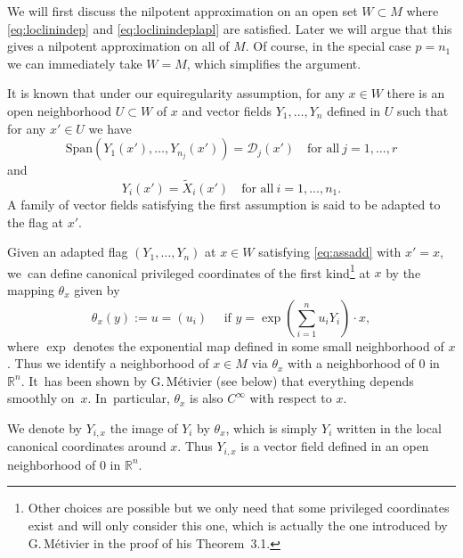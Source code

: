 \documentclass[10pt]{amsart}
\theoremstyle{definition}
\newcommand{\1}{\mathbbm{1}}
\newcommand{\R}{\mathbb{R}}
\begin{document}
We will first discuss the nilpotent approximation on an open set $W\subset M$ where \eqref{eq:loclinindep} and \eqref{eq:loclinindeplapl} are satisfied. Later we will argue that this gives a nilpotent approximation on all of $M$. Of course, in the special case $p=n_1$ we can immediately take $W=M$, which simplifies the argument.

It is known that under our equiregularity assumption, for any $x\in W$ there is an open neighborhood $U\subset W$ of $x$ and vector fields $Y_1,\ldots,Y_n$ defined in $U$ such that for any $x'\in U$ we have
\[
\text{Span}(Y_1(x'),\ldots,Y_{n_j}(x'))=\mathcal{D}_j(x')
\quad\text{for all}\ j=1,\ldots, r
\]
and
\begin{equation}\label{eq:assadd}
Y_i(x') =\tilde X_i(x') \quad\text{for all}\ i=1,\ldots,n_1.
\end{equation}
A family of vector fields satisfying the first assumption is said to be adapted to the flag at $x'$.

Given an adapted flag $(Y_1,\ldots,Y_n)$ at $x\in W$ satisfying \eqref{eq:assadd} with $x'=x$, we~can define canonical privileged coordinates of the first kind\footnote{Other choices are possible but we only need that some privileged coordinates exist and will only consider this one, which is actually the one introduced by G.\,Métivier \cite{Me} in the proof of his Theorem~3.1.} at $x$ by the mapping $\theta_x$ given by
\begin{equation} \label{eq:pc}
\theta_x (y) := u = (u_{i}) \quad\mbox{ if } y = \exp (\sum_{i=1}^n u_{i}Y_i) \cdot x,
\end{equation} where $\exp$ denotes the exponential map defined in some small neighborhood of $x$.
Thus we identify a neighborhood of $x\in M$ via $\theta_x$ with a neighborhood of $0$ in $\mathbb R^n$. It~has been shown by G.\,Métivier (see below) that everything depends smoothly on~$x$. In~particular, $\theta_x$ is also $C^\infty$ with respect to $x$.

We denote by $Y_{i,x}$ the image of $Y_i$ by $\theta_x$,
which is simply $Y_i$ written in the local canonical coordinates around $x$. Thus $Y_{i,x}$ is a vector field defined in an open neighborhood of $0$ in $\R^n$.
\end{document}

